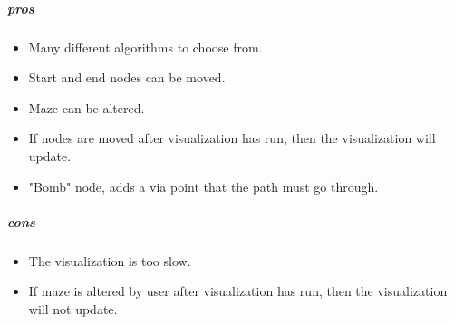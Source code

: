 \documentclass{article}
\begin{document}
\subparagraph*{pros}
\begin{itemize}
    \item Many different algorithms to choose from.
    \item Start and end nodes can be moved.
    \item Maze can be altered.
    \item If nodes are moved after visualization has run, then the visualization will update.
    \item "Bomb" node, adds a via point that the path must go through.
\end{itemize}
\subparagraph*{cons}
\begin{itemize}
    \item The visualization is too slow.
    \item If maze is altered by user after visualization has run, then the visualization will not update.
\end{itemize}
\end{document}
